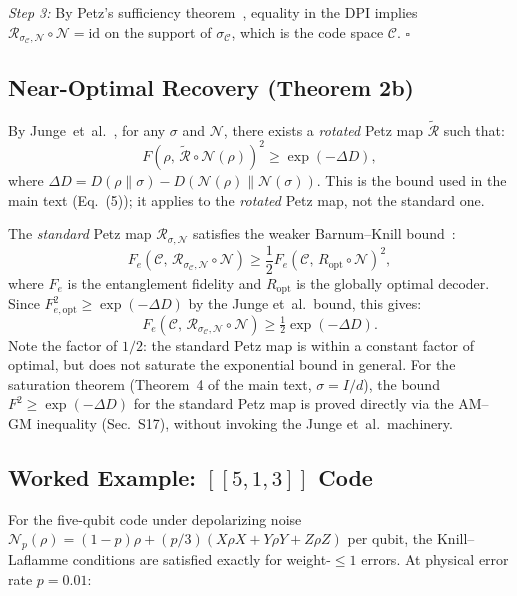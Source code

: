 \documentclass[prl,twocolumn,superscriptaddress,longbibliography]{revtex4-2}
\newcommand{\id}{\mathrm{id}}
\newcommand{\Petz}{\mathcal{R}}
\newcommand{\chan}{\mathcal{N}}
\newcommand{\code}{\mathcal{C}}
\begin{document}
\emph{Step 3:} By Petz's sufficiency theorem~\cite{Petz1988}, equality
in the DPI implies $\Petz_{\sigma_\code,\chan} \circ \chan = \id$ on the
support of $\sigma_\code$, which is the code space $\code$. \hfill$\square$

\subsection{Near-Optimal Recovery (Theorem 2b)}

By Junge~et~al.~\cite{Junge2018}, for any $\sigma$ and $\chan$, there
exists a \emph{rotated} Petz map $\tilde{\Petz}$ such that:
\begin{equation}
F(\rho,\, \tilde{\Petz} \circ \chan(\rho))^2 \geq
\exp(-\Delta D),
\end{equation}
where $\Delta D = D(\rho\|\sigma) - D(\chan(\rho)\|\chan(\sigma))$.
This is the bound used in the main text (Eq.~(5)); it applies to the
\emph{rotated} Petz map, not the standard one.

The \emph{standard} Petz map $\Petz_{\sigma,\chan}$ satisfies the
weaker Barnum--Knill bound~\cite{Barnum2002}:
\begin{equation}
F_e(\code,\, \Petz_{\sigma_\code,\chan} \circ \chan) \geq
\frac{1}{2} F_e(\code,\, R_{\mathrm{opt}} \circ \chan)^2,
\end{equation}
where $F_e$ is the entanglement fidelity and $R_{\mathrm{opt}}$ is the
globally optimal decoder. Since $F_{e,\mathrm{opt}}^2 \geq
\exp(-\Delta D)$ by the Junge et~al.\ bound, this gives:
\begin{equation}
F_e(\code,\, \Petz_{\sigma_\code,\chan} \circ \chan) \geq
\tfrac{1}{2}\exp(-\Delta D).
\end{equation}
Note the factor of $1/2$: the standard Petz map is within a
constant factor of optimal, but does not saturate the exponential
bound in general.  For the saturation theorem
(Theorem~4 of the main text, $\sigma = I/d$), the bound
$F^2 \geq \exp(-\Delta D)$ for the standard Petz map is proved
directly via the AM--GM inequality (Sec.~S17), without invoking the
Junge et~al.\ machinery.

\subsection{Worked Example: $[\![5,1,3]\!]$ Code}

For the five-qubit code under depolarizing noise $\chan_p(\rho) =
(1-p)\rho + (p/3)(X\rho X + Y\rho Y + Z\rho Z)$ per qubit, the
Knill--Laflamme conditions are satisfied exactly for weight-$\leq 1$
errors. At physical error rate $p = 0.01$:
\end{document}
